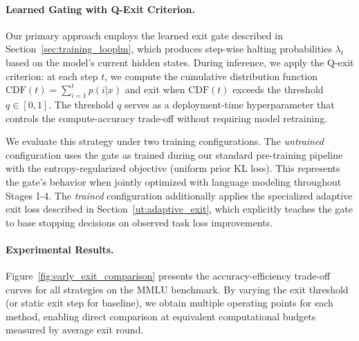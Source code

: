 \documentclass[]{bytedance_seed}
\newcommand{\1}{\mathbf{1}}
\begin{document}
\paragraph{Learned Gating with Q-Exit Criterion.}
Our primary approach employs the learned exit gate described in Section~\ref{sec:training_looplm}, which produces step-wise halting probabilities $\lambda_t$ based on the model's current hidden states. During inference, we apply the Q-exit criterion: at each step $t$, we compute the cumulative distribution function $\text{CDF}(t) = \sum_{i=1}^{t} p(i|x)$ and exit when $\text{CDF}(t)$ exceeds the threshold $q \in [0,1]$. The threshold $q$ serves as a deployment-time hyperparameter that controls the compute-accuracy trade-off without requiring model retraining.

We evaluate this strategy under two training configurations. The \textit{untrained} configuration uses the gate as trained during our standard pre-training pipeline with the entropy-regularized objective (uniform prior KL loss). This represents the gate's behavior when jointly optimized with language modeling throughout Stages 1-4. The \textit{trained} configuration additionally applies the specialized adaptive exit loss described in Section~\ref{ut:adaptive_exit}, which explicitly teaches the gate to base stopping decisions on observed task loss improvements.



\paragraph{Experimental Results.}
Figure~\ref{fig:early_exit_comparison} presents the accuracy-efficiency trade-off curves for all strategies on the MMLU benchmark. By varying the exit threshold (or static exit step for baseline), we obtain multiple operating points for each method, enabling direct comparison at equivalent computational budgets measured by average exit round.
\end{document}
